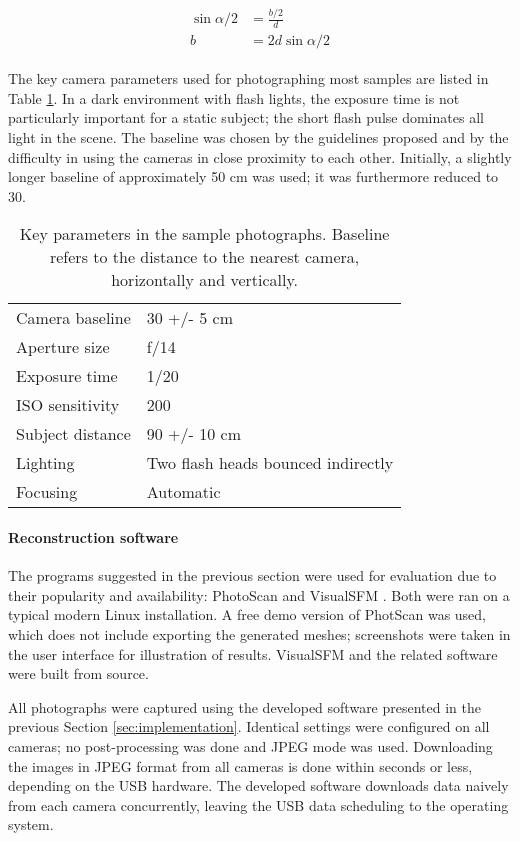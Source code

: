 \begin{align} \begin{split} \label{eq:baselinedegrees}
	\sin \alpha/2 &= \frac{b/2}{d}\\
	b &= 2 d \sin \alpha/2
\end{split} \end{align}

The key camera parameters used for photographing most samples are listed in Table \ref{tab:sampleshotparams}.
In a dark environment with flash lights, the exposure time is not particularly important for a static subject; the short flash pulse dominates all light in the scene.
The baseline was chosen by the guidelines proposed and by the difficulty in using the cameras in close proximity to each other.
Initially, a slightly longer baseline of approximately 50 cm was used; it was furthermore reduced to 30.

\begin{table}[h]
	\centering
	\begin{tabular}{l l}
		Camera baseline & 30 +/- 5 cm\\
		Aperture size & f/14\\
		Exposure time & 1/20\\
		ISO sensitivity & 200\\
		Subject distance & 90 +/- 10 cm\\
		Lighting & Two flash heads bounced indirectly\\
		Focusing & Automatic\\
	\end{tabular}
	\caption{
		Key parameters in the sample photographs.
		Baseline refers to the distance to the nearest camera, horizontally and vertically.
	}
	\label{tab:sampleshotparams}
\end{table}

\paragraph{Reconstruction software}
The programs suggested in the previous section were used for evaluation due to their popularity and availability: PhotoScan \cite{photoscan} and VisualSFM \cite{wu2013towards}.
Both were ran on a typical modern Linux installation.
A free demo version of PhotScan was used, which does not include exporting the generated meshes; screenshots were taken in the user interface for illustration of results.
VisualSFM and the related software were built from source.

All photographs were captured using the developed software presented in the previous Section \ref{sec:implementation}.
Identical settings were configured on all cameras; no post-processing was done and JPEG mode was used.
Downloading the images in JPEG format from all cameras is done within seconds or less, depending on the USB hardware.
The developed software downloads data naively from each camera concurrently, leaving the USB data scheduling to the operating system.
